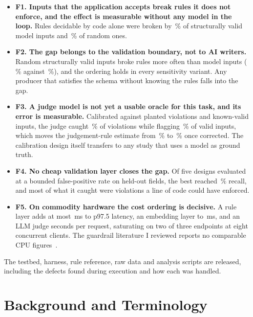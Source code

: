 \documentclass[conference]{IEEEtran}
\begin{document}
\begin{itemize}
  \item \textbf{F1. Inputs that the application accepts break rules it does not enforce, and the
  effect is measurable without any model in the loop.} Rules decidable by code alone were broken by
  \,\% of structurally valid model inputs and \,\% of random ones.
  \item \textbf{F2. The gap belongs to the validation boundary, not to AI writers.} Random
  structurally valid inputs broke rules more often than model inputs (\,\% against
  \,\%), and the ordering holds in every sensitivity variant. Any producer that satisfies
  the schema without knowing the rules falls into the gap.
  \item \textbf{F3. A judge model is not yet a usable oracle for this task, and its error is
  measurable.} Calibrated against planted violations and known-valid inputs, the judge caught
  \,\% of violations while flagging \,\% of valid inputs, which moves the
  judgement-rule estimate from \,\% to \,\% once corrected. The
  calibration design itself transfers to any study that uses a model as ground truth.
  \item \textbf{F4. No cheap validation layer closes the gap.} Of five designs evaluated at a bounded
  false-positive rate on held-out fields, the best reached \,\% recall, and most of
  what it caught were violations a line of code could have enforced.
  \item \textbf{F5. On commodity hardware the cost ordering is decisive.} A rule layer adds at most
  \,ms to p97.5 latency, an embedding layer
   to \,ms, and an LLM judge seconds per request, saturating on
  two of three endpoints at eight concurrent clients. The guardrail literature I reviewed reports no
  comparable CPU figures~\cite{jacob2025promptshield,ahmed2026reflexguard,saleem2026layered,wang2026sokguardrails}.
\end{itemize}

The testbed, harness, rule reference, raw data and analysis scripts are released, including the
defects found during execution and how each was handled.

\section{Background and Terminology}
\label{sec:background}
\end{document}
